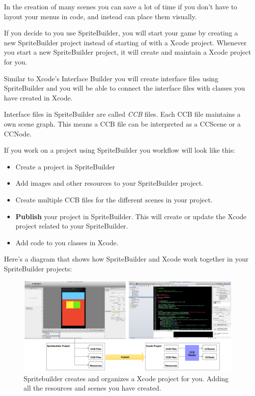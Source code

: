 \documentclass{scrreprt}
\newcommand{\spriteb}{SpriteBuilder}
\begin{document}
In the creation of many scenes you can save a lot of time if you don't
have to layout your menus in code, and instead can place them visually.

If you decide to you use \spriteb{}, you will start your game by creating a new
\spriteb{} project instead of starting of with a Xcode project. Whenever you
start a new \spriteb{} project, it will create and maintain a Xcode project for
you.

Similar to Xcode's Interface Builder you will create interface files using
\spriteb{} and you will be able to connect the interface files with classes you
have created in Xcode.

Interface files in \spriteb{} are called \textit{CCB} files. Each 
CCB file maintains a own scene graph. This means a CCB file can be interpreted
as a CCScene or a CCNode.

If you work on a project using \spriteb{} you workflow will look like this:
\begin{itemize}
  \item Create a project in \spriteb{}
  \item Add images and other resources to your \spriteb{} project.
  \item Create multiple CCB files for the different scenes in your project.
  \item \textbf{Publish} your project in \spriteb{}. This will create or update
  the Xcode project related to your \spriteb{}. 
  \item Add code to you classes in Xcode.
\end{itemize}

Here's a diagram that shows how \spriteb{} and Xcode work together in your
\spriteb{} projects:

\begin{figure}[H]
		\centering
		\includegraphics[width=400pt]{images/spritebuilder_publishing.png}     
		\caption{Spritebuilder creates and organizes a Xcode project for you. Adding
		all the resources and scenes you have created.}
\end{figure}
\end{document}
